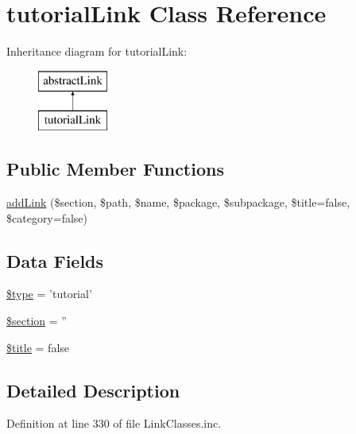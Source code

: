\hypertarget{classtutorial_link}{\section{tutorial\-Link \-Class \-Reference}
\label{classtutorial_link}
}
\-Inheritance diagram for tutorial\-Link\-:\begin{figure}[H]
\begin{center}
\leavevmode
\includegraphics[height=2.000000cm]{classtutorial_link}
\end{center}
\end{figure}
\subsection*{\-Public \-Member \-Functions}
\begin{DoxyCompactItemize}
\item 
\hyperlink{classtutorial_link_af6e6798b75d964468c97f062478f7f98}{add\-Link} (\$section, \$path, \$name, \$package, \$subpackage, \$title=false, \$category=false)
\end{DoxyCompactItemize}
\subsection*{\-Data \-Fields}
\begin{DoxyCompactItemize}
\item 
\hyperlink{classtutorial_link_a9a4a6fba2208984cabb3afacadf33919}{\$type} = 'tutorial'
\item 
\hyperlink{classtutorial_link_ab43f8e6991eef502a47086fd771e6c94}{\$section} = ''
\item 
\hyperlink{classtutorial_link_ada57e7bb7c152edad18fe2f166188691}{\$title} = false
\end{DoxyCompactItemize}


\subsection{\-Detailed \-Description}


\-Definition at line 330 of file \-Link\-Classes.\-inc.



